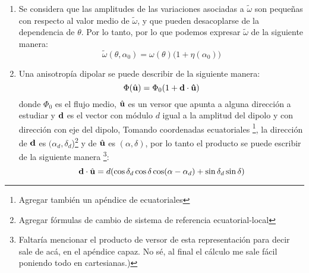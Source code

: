 \begin{enumerate}
    \item Se considera que las amplitudes de las variaciones asociadas a $\tilde{\omega}$ son pequeñas con respecto al valor medio de $\tilde{\omega}$, y que pueden  desacoplarse de la dependencia de $\theta$. Por lo tanto, por lo que podemos expresar $\tilde{\omega}$ de la siguiente manera:
    \begin{equation}
        \tilde{\omega}(\theta, \alpha_0) = \omega(\theta)\big(1 + \eta(\alpha_0) \big)
        \label{eq:omega_expandido}
    \end{equation}

    \item Una anisotropía dipolar se puede describir de la siguiente manera:
    \begin{equation}
        \Phi(\hat{\bf{u}}) = \Phi_0(1+\bf{d}\cdot\hat{\bf{u}})
        \label{eq:dipolo_general}
    \end{equation}
    \noindent donde $\Phi_0$ es el flujo medio, $\hat{\bf{u}}$ es un versor que apunta a alguna dirección a estudiar y $\bf{d}$ es el vector con módulo $d$ igual a la amplitud del dipolo y  con dirección  con eje del dipolo, Tomando coordenadas ecuatoriales \footnote{Agregar también un apéndice de ecuatoriales}, la dirección de $\bf{d}$ es $(\alpha_d, \delta_d$)\footnote{Agregar fórmulas de cambio de sistema de referencia ecuatorial-local} y  de $\hat{\bf{u}}$ es $(\alpha, \delta)$, por lo tanto  el producto se puede escribir de la siguiente manera \footnote{Faltaría mencionar el producto de versor de esta representación para decir sale de acá, en el apéndice capaz. No sé, al final el cálculo me  sale fácil poniendo  todo en cartesianas.)}:
    \begin{equation*}
        \textbf{d}\cdot\hat{\bf{u}}= d (\cos\delta_d \cos\delta \cos(\alpha - \alpha_d) + \sin\delta_d  \sin\delta)
        \label{eq:product_ud}
    \end{equation*}

    
    
      

\end{enumerate}
